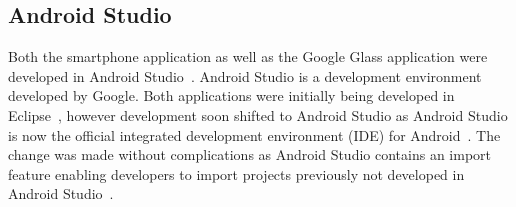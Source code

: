 

\subsection{Android Studio}
Both the smartphone application as well as the Google Glass application were developed in Android Studio~\cite{androidStudio}. Android Studio is a development environment developed by Google. Both applications were initially being developed in Eclipse~\cite{eclipse}, however development soon shifted to Android Studio as Android Studio is now the official integrated development environment (IDE) for Android~\cite{androidIDE}. The change was made without complications as Android Studio contains an import feature enabling developers to import projects previously not developed in Android Studio~\cite{androidIDE}.%







